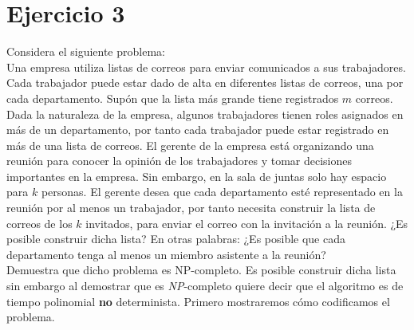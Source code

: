 \documentclass[12pt,letterpaper]{article}
\begin{document}
\section*{Ejercicio 3}
Considera el siguiente problema:\\
Una empresa utiliza listas de correos para enviar comunicados a sus trabajadores. Cada trabajador puede estar dado de alta en diferentes listas de correos, una por cada departamento. Supón que la lista más grande tiene registrados $m$ correos. Dada la naturaleza de la empresa, algunos trabajadores tienen roles asignados en más de un departamento, por tanto cada trabajador puede estar registrado en más de una lista de correos. El gerente de la empresa está organizando una reunión para conocer la opinión de los trabajadores y tomar decisiones importantes en la empresa. Sin embargo, en la sala de juntas solo hay espacio para $k$ personas. El gerente desea que cada departamento esté representado en la reunión por al menos un trabajador, por tanto necesita construir la lista de correos de los $k$ invitados, para enviar el correo con la invitación a la reunión. ¿Es posible construir dicha lista? En otras palabras: ¿Es posible que cada departamento tenga al menos un miembro asistente a la reunión?\\
Demuestra que dicho problema es NP-completo.
\newpage
Es posible construir dicha lista sin embargo al demostrar que es \textit{NP}-completo quiere decir que el algoritmo es de tiempo polinomial \textbf{no} determinista. Primero mostraremos cómo codificamos el problema.
\end{document}
